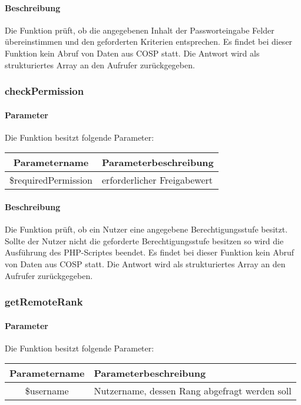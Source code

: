 \paragraph{Beschreibung} Die Funktion prüft, ob die angegebenen Inhalt der Passworteingabe Felder übereinstimmen und den geforderten Kriterien entsprechen. Es findet bei dieser Funktion kein Abruf von Daten aus {\glqq COSP\grqq} statt. Die Antwort wird als strukturiertes Array an den Aufrufer zurückgegeben.\\
\subsubsection{checkPermission}
\paragraph{Parameter} Die Funktion besitzt folgende Parameter:
\begin{table}[H]
	\begin{tabular}{|c|p{11cm}|}
		\hline
		\textbf{Parametername} & \textbf{Parameterbeschreibung} \\ \hline
		\$requiredPermission & erforderlicher Freigabewert \\ \hline
	\end{tabular}
\end{table}
\paragraph{Beschreibung} Die Funktion prüft, ob ein Nutzer eine angegebene Berechtigungsstufe besitzt. Sollte der Nutzer nicht die geforderte Berechtigungsstufe besitzen so wird die Ausführung des PHP-Scriptes beendet. Es findet bei dieser Funktion kein Abruf von Daten aus {\glqq COSP\grqq} statt. Die Antwort wird als strukturiertes Array an den Aufrufer zurückgegeben.
\subsubsection{getRemoteRank}
\paragraph{Parameter} Die Funktion besitzt folgende Parameter:
\begin{table}[H]
	\begin{tabular}{|c|p{11cm}|}
		\hline
		\textbf{Parametername} & \textbf{Parameterbeschreibung} \\ \hline
		\$username & Nutzername, dessen Rang abgefragt werden soll \\ \hline
	\end{tabular}
\end{table}

